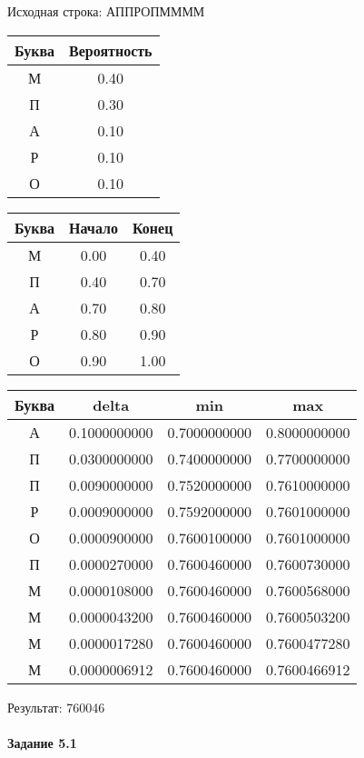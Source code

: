\documentclass[a4paper, 12pt]{article}
\begin{document}
Исходная строка: АППРОПММММ\
\begin{center}
 \begin{tabular}{ |c|c| } 
  \hline
     Буква & Вероятность \\ \hline
М & 0.40\\\hline
П & 0.30\\\hline
А & 0.10\\\hline
Р & 0.10\\\hline
О & 0.10
\\ \hline \end{tabular}
\end{center}
\begin{center}
 \begin{tabular}{ |c|c|c| } 
  \hline
     Буква & Начало & Конец \\ \hline
М & 0.00 & 0.40\\\hline
П & 0.40 & 0.70\\\hline
А & 0.70 & 0.80\\\hline
Р & 0.80 & 0.90\\\hline
О & 0.90 & 1.00
\\ \hline \end{tabular}
\end{center}
\begin{center}
 \begin{tabular}{ |c|c|c|c| } 
  \hline
     Буква & delta & min & max \\ \hline
А & 0.1000000000 & 0.7000000000 & 0.8000000000\\\hline
П & 0.0300000000 & 0.7400000000 & 0.7700000000\\\hline
П & 0.0090000000 & 0.7520000000 & 0.7610000000\\\hline
Р & 0.0009000000 & 0.7592000000 & 0.7601000000\\\hline
О & 0.0000900000 & 0.7600100000 & 0.7601000000\\\hline
П & 0.0000270000 & 0.7600460000 & 0.7600730000\\\hline
М & 0.0000108000 & 0.7600460000 & 0.7600568000\\\hline
М & 0.0000043200 & 0.7600460000 & 0.7600503200\\\hline
М & 0.0000017280 & 0.7600460000 & 0.7600477280\\\hline
М & 0.0000006912 & 0.7600460000 & 0.7600466912
\\ \hline \end{tabular}
\end{center}
Результат: 760046
\pagebreak
\paragraph{Задание 5.1}
\end{document}
